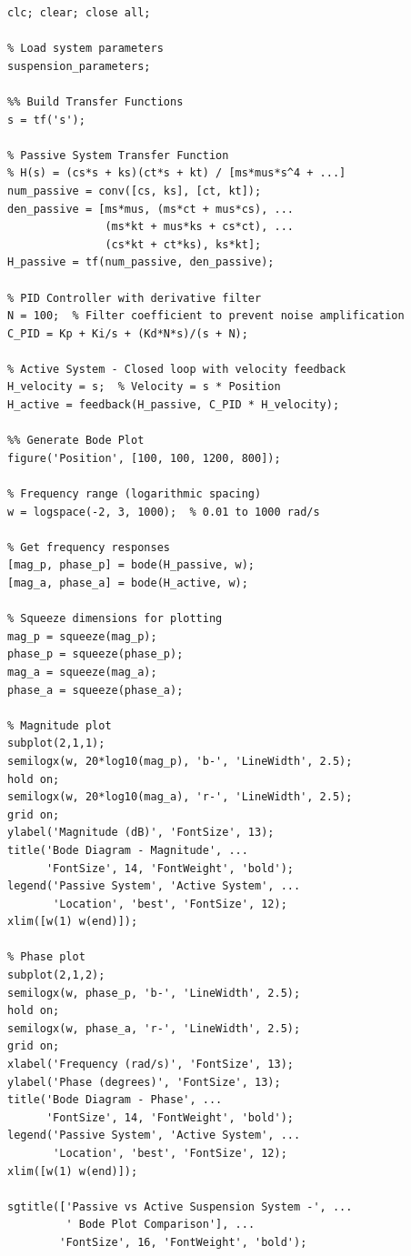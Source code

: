 \documentclass[12pt,a4paper]{article}
\begin{document}
\begin{lstlisting}[caption={Bode plot comparison and performance metrics calculation}]
%% Bode Plot Comparison: Passive vs Active
clc; clear; close all;

% Load system parameters
suspension_parameters;

%% Build Transfer Functions
s = tf('s');

% Passive System Transfer Function
% H(s) = (cs*s + ks)(ct*s + kt) / [ms*mus*s^4 + ...]
num_passive = conv([cs, ks], [ct, kt]);
den_passive = [ms*mus, (ms*ct + mus*cs), ...
               (ms*kt + mus*ks + cs*ct), ...
               (cs*kt + ct*ks), ks*kt];
H_passive = tf(num_passive, den_passive);

% PID Controller with derivative filter
N = 100;  % Filter coefficient to prevent noise amplification
C_PID = Kp + Ki/s + (Kd*N*s)/(s + N);

% Active System - Closed loop with velocity feedback
H_velocity = s;  % Velocity = s * Position
H_active = feedback(H_passive, C_PID * H_velocity);

%% Generate Bode Plot
figure('Position', [100, 100, 1200, 800]);

% Frequency range (logarithmic spacing)
w = logspace(-2, 3, 1000);  % 0.01 to 1000 rad/s

% Get frequency responses
[mag_p, phase_p] = bode(H_passive, w);
[mag_a, phase_a] = bode(H_active, w);

% Squeeze dimensions for plotting
mag_p = squeeze(mag_p);
phase_p = squeeze(phase_p);
mag_a = squeeze(mag_a);
phase_a = squeeze(phase_a);

% Magnitude plot
subplot(2,1,1);
semilogx(w, 20*log10(mag_p), 'b-', 'LineWidth', 2.5);
hold on;
semilogx(w, 20*log10(mag_a), 'r-', 'LineWidth', 2.5);
grid on;
ylabel('Magnitude (dB)', 'FontSize', 13);
title('Bode Diagram - Magnitude', ...
      'FontSize', 14, 'FontWeight', 'bold');
legend('Passive System', 'Active System', ...
       'Location', 'best', 'FontSize', 12);
xlim([w(1) w(end)]);

% Phase plot
subplot(2,1,2);
semilogx(w, phase_p, 'b-', 'LineWidth', 2.5);
hold on;
semilogx(w, phase_a, 'r-', 'LineWidth', 2.5);
grid on;
xlabel('Frequency (rad/s)', 'FontSize', 13);
ylabel('Phase (degrees)', 'FontSize', 13);
title('Bode Diagram - Phase', ...
      'FontSize', 14, 'FontWeight', 'bold');
legend('Passive System', 'Active System', ...
       'Location', 'best', 'FontSize', 12);
xlim([w(1) w(end)]);

sgtitle(['Passive vs Active Suspension System -', ...
         ' Bode Plot Comparison'], ...
        'FontSize', 16, 'FontWeight', 'bold');


\end{lstlisting}
\end{document}

